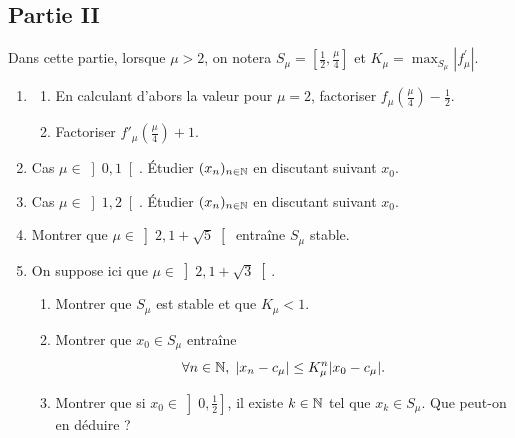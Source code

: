\subsection*{Partie II}
Dans cette partie, lorsque $\mu>2$, on notera $S_\mu = [\frac{1}{2},\frac{\mu}{4}]$ et $K_\mu =\max _{S_\mu}|f_\mu ^\prime|$.
\begin{enumerate}
\item\begin{enumerate}
 \item En calculant d'abors la valeur pour $\mu=2$, factoriser $f_\mu(\frac{\mu}{4})-\frac{1}{2}$. 
\item Factoriser $f'_\mu(\frac{\mu}{4})+1$.
\end{enumerate}

\item Cas $\mu \in \left]0,1\right[$. \'Etudier $(x_n)_{n\in\mathbb{N}}$ en discutant suivant $x_0$.
\item Cas $\mu \in \left]1,2 \right[$. \'Etudier $(x_n)_{n\in\mathbb{N}}$ en discutant suivant $x_0$.
\item Montrer que $\mu \in \left]2,1+\sqrt{5} \right[$ entraîne $S_\mu$ stable.
\item On suppose ici que $\mu \in \left]2,1+\sqrt{3}\right[$.
\begin{enumerate}
 \item Montrer que $S_\mu$ est stable et que $K_\mu < 1$.
\item Montrer que $x_0\in S_\mu$ entraîne
\[
\forall n\in \mathbb{N}, \; |x_n - c_\mu|\leq K_\mu ^n |x_0 - c_\mu|.
\]
 \item Montrer que si $x_0\in \left]0,\frac{1}{2} \right]$, il existe $k\in \mathbb{N}$ tel que $x_k\in S_\mu$. Que peut-on en déduire ?
\end{enumerate}

\end{enumerate}

